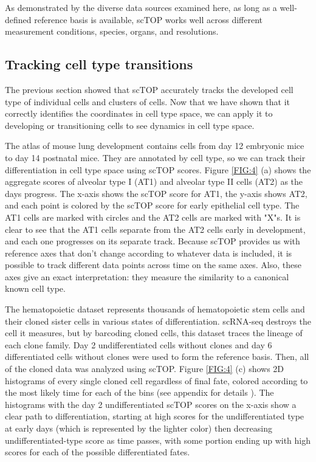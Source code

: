 \documentclass[aps,superscriptaddress, notitlepage,longbibliography]{revtex4-1}
\begin{document}
As demonstrated by the diverse data sources examined here, as long as a well-defined reference basis is available, scTOP works well across different measurement conditions, species, organs, and resolutions.

\subsection{Tracking cell type transitions}
The previous section showed that scTOP accurately tracks the developed cell type of individual cells and clusters of cells. Now that we have shown that it correctly identifies the coordinates in cell type space, we can apply it to developing or transitioning cells to see dynamics in cell type space.

The atlas of mouse lung development\cite{negretti_single-cell_2021} contains cells from day 12 embryonic mice to day 14 postnatal mice. They are annotated by cell type, so we can track their differentiation in cell type space using scTOP scores. Figure \ref{FIG:4} (a) shows the aggregate scores of alveolar type I (AT1) and alveolar type II cells (AT2) as the days progress. The x-axis shows the scTOP score for AT1, the y-axis shows AT2, and each point is colored by the scTOP score for early epithelial cell type. The AT1 cells are marked with circles and the AT2 cells are marked with "X"s. It is clear to see that the AT1 cells separate from the AT2 cells early in development, and each one progresses on its separate track. Because scTOP provides us with reference axes that don't change according to whatever data is included, it is possible to track different data points across time on the same axes. Also, these axes give an exact interpretation: they measure the similarity to a canonical known cell type.

The hematopoietic dataset\cite{weinreb_lineage_2020} represents thousands of hematopoietic stem cells and their cloned sister cells in various states of differentiation. scRNA-seq destroys the cell it measures, but by barcoding cloned cells, this dataset traces the lineage of each clone family. Day 2 undifferentiated cells without clones and day 6 differentiated cells without clones were used to form the reference basis. Then, all of the cloned data was analyzed using scTOP. Figure \ref{FIG:4} (c) shows 2D histograms of every single cloned cell regardless of final fate, colored according to the most likely time for each of the bins (see appendix for details ). The histograms with the day 2 undifferentiated scTOP scores on the x-axis show a clear path to differentiation, starting at high scores for the undifferentiated type at early days (which is represented by the lighter color) then decreasing undifferentiated-type score as time passes, with some portion ending up with high scores for each of the possible differentiated fates.
\end{document}
